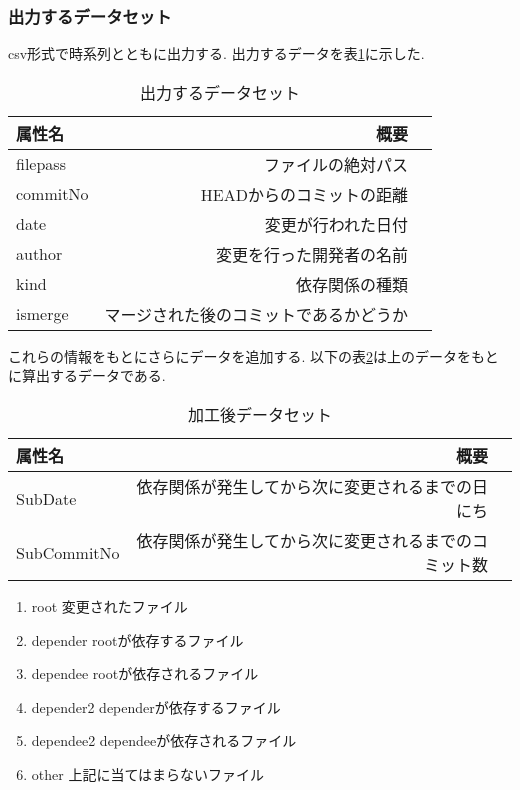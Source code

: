 \documentclass[submit,ses,noauthor]{ipsj} %
\begin{document}
\subsubsection{出力するデータセット}
csv形式で時系列とともに出力する.
出力するデータを表\ref{tab:初期データセット}に示した.

\begin{table}[htb]
\caption{出力するデータセット}
\begin{tabular}{|l|r|r|} \hline
属性名 & 概要 \\ \hline
filepass & ファイルの絶対パス \\ \hline
commitNo & HEADからのコミットの距離 \\ \hline
date & 変更が行われた日付 \\ \hline
author & 変更を行った開発者の名前 \\ \hline
kind & 依存関係の種類 \\ \hline
ismerge & マージされた後のコミットであるかどうか \\ \hline
\end{tabular}
\label{tab:初期データセット}
\end{table}


これらの情報をもとにさらにデータを追加する.
以下の表\ref{tab:加工後データセット}は上のデータをもとに算出するデータである.

\begin{table}[htb]
\caption{加工後データセット}
\begin{tabular}{|l|r|r|} \hline
属性名 & 概要 \\ \hline
SubDate & 依存関係が発生してから次に変更されるまでの日にち \\ \hline
SubCommitNo & 依存関係が発生してから次に変更されるまでのコミット数 \\ \hline
\end{tabular}
\label{tab:加工後データセット}
\end{table}

\begin{enumerate}
\item root 変更されたファイル
\item depender rootが依存するファイル
\item dependee rootが依存されるファイル
\item depender2 dependerが依存するファイル
\item dependee2 dependeeが依存されるファイル
\item other 上記に当てはまらないファイル
\end{enumerate}
\end{document}
